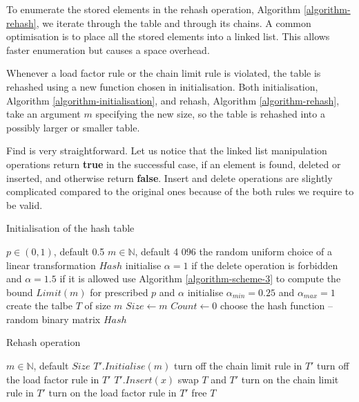 To enumerate the stored elements in the rehash operation, Algorithm \ref{algorithm-rehash}, we iterate through the table and through its chains. A common optimisation is to place all the stored elements into a linked list. This allows faster enumeration but causes a space overhead.

Whenever a load factor rule or the chain limit rule is violated, the table is rehashed using a new function chosen in initialisation. Both initialisation, Algorithm \ref{algorithm-initialisation}, and rehash, Algorithm \ref{algorithm-rehash}, take an argument $m$ specifying the new size, so the table is rehashed into a possibly larger or smaller table.

Find is very straightforward. Let us notice that the linked list manipulation operations return \textbf{true} in the successful case, if an element is found, deleted or inserted, and otherwise return \textbf{false}. Insert and delete  operations are slightly complicated compared to the original ones because of the both rules we require to be valid.

\begin{algorithm}[p]
\caption{Initialisation of the hash table}
\label{algorithm-initialisation}
\begin{algorithmic}
\REQUIRE $p \in (0, 1)$, default 0.5
\REQUIRE $m \in \mathbb{N}$, default 4 096
\STATE
\ENSURE the random uniform choice of a linear transformation $Hash$
\STATE
\STATE initialise $\alpha = 1$ if the delete operation is forbidden and $\alpha = 1.5$ if it is allowed
\STATE use Algorithm \ref{algorithm-scheme-3} to compute the bound $Limit(m)$ for prescribed $p$ and $\alpha$
\STATE initialise $\alpha_{min} = 0.25$ and $\alpha_{max} = 1$
\STATE create the talbe $T$ of size $m$
\STATE $Size \leftarrow m$
\STATE $Count \leftarrow 0$
\STATE choose the hash function -- random binary matrix $Hash$
\end{algorithmic}
\end{algorithm}

\begin{algorithm}[p]
\caption{Rehash operation}
\label{algorithm-rehash}
\begin{algorithmic}
\REQUIRE $m \in \mathbb{N}$, default $Size$ 
\STATE
\REPEAT
	\STATE $T'.Initialise(m)$
	\STATE turn off the chain limit rule in $T'$
	\STATE turn off the load factor rule in $T'$
		\STATE $T'.Insert(x)$
	\ENDFOR
{}
\STATE
\STATE swap $T$ and $T'$
\STATE turn on the chain limit rule in $T'$
\STATE turn on the load factor rule in $T'$
\STATE free $T$
\end{algorithmic}
\end{algorithm}

